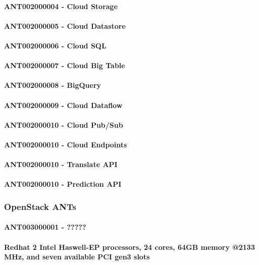 \documentclass{acm_proc_article-sp}
\begin{document}
\paragraph{ANT002000004 - Cloud Storage}
\paragraph{ANT002000005 - Cloud Datastore}
\paragraph{ANT002000006 - Cloud SQL}
\paragraph{ANT002000007 - Cloud Big Table}
\paragraph{ANT002000008 - BigQuery}
\paragraph{ANT002000009 - Cloud Dataflow}
\paragraph{ANT002000010 - Cloud Pub/Sub}
\paragraph{ANT002000010 - Cloud Endpoints}
\paragraph{ANT002000010 - Translate API}
\paragraph{ANT002000010 - Prediction API}
\subsubsection{OpenStack ANTs}
\paragraph{ANT003000001 - ?????}
\paragraph{Redhat 2 Intel Haswell-EP processors, 24 cores, 64GB memory @2133 MHz, and seven available PCI gen3 slots}
\end{document}
